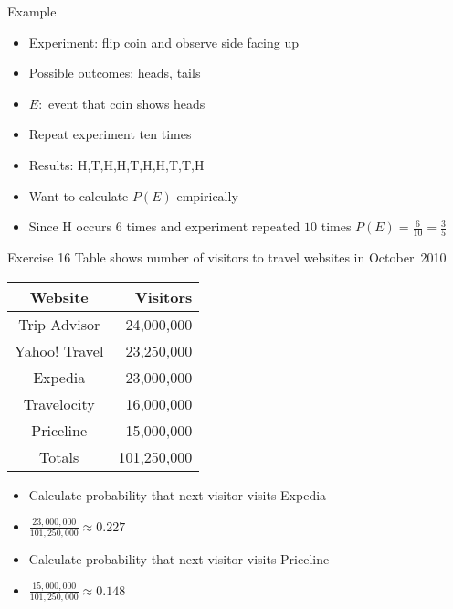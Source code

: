 \documentclass{beamer}
\theoremstyle{definition}
\begin{document}
\begin{frame}{Example}
\begin{itemize}
\item Experiment: flip coin and observe side facing up
\item Possible outcomes: heads, tails
\item $E:$ event that coin shows heads
\item Repeat experiment ten times
\item Results: H,T,H,H,T,H,H,T,T,H
\item Want to calculate $P\left(E\right)$ empirically
\item Since H occurs $6$ times
and experiment repeated $10$ times
$P\left(E\right)=\frac{6}{10}=\frac{3}{5}$
\end{itemize}
\end{frame}

\begin{frame}{Exercise 16}
Table shows number of visitors to travel websites in October~2010
\begin{center}\begin{tabular}{cr}
Website&Visitors\\\hline
Trip Advisor&24,000,000\\
Yahoo! Travel&23,250,000\\
Expedia&23,000,000\\
Travelocity&16,000,000\\
Priceline&15,000,000\\\hline
Totals&101,250,000
\end{tabular}\end{center}
\begin{itemize}
\item Calculate probability that next visitor visits Expedia
\item $\frac{23,000,000}{101,250,000}\approx 0.227$
\item Calculate probability that next visitor visits Priceline 
\item $\frac{15,000,000}{101,250,000}\approx 0.148$
\end{itemize}
\end{frame}
\end{document}
